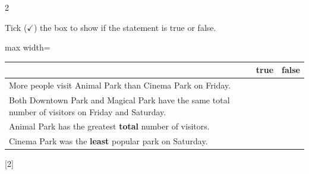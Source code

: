 \documentclass[12pt]{article}
\newcommand{\QuestionMarks}[1]{\hfill [#1]}
\newcommand{\BoxedQuestionLabel}[1]{%
	\begingroup
	\setlength{\fboxsep}{0pt}%
	\raisebox{-0.12cm}{%
		\fbox{%
			\makebox[0.68cm][c]{\rule[-0.18cm]{0pt}{0.68cm}\textbf{#1}}%
		}%
	}%
	\endgroup
}
\begin{document}
\begin{multicols}{2}
\begin{enumerate}[
			label=\BoxedQuestionLabel{\arabic*},
			leftmargin=1.1cm,
			labelwidth=0.72cm,
			labelsep=0.25cm,
			itemsep=0pt,
			topsep=0pt,
			parsep=0pt
			]
			Tick (\(\checkmark\)) the box to show if the statement is true or false.
			
			\vspace{0.35cm}
			
			\begin{center}
				\begin{adjustbox}{max width=\linewidth}
					\begin{tabular}{|>{\raggedright\arraybackslash}p{6.2cm}|>{\centering\arraybackslash}p{0.95cm}|>{\centering\arraybackslash}p{0.95cm}|}
						\cline{2-3}
						\multicolumn{1}{c|}{} & \textbf{true} & \textbf{false} \\
						\hline
						More people visit Animal Park than Cinema Park on Friday. &
						\rule{0pt}{1.0cm} & \\
						\hline
						Both Downtown Park and Magical Park have the same total number of visitors on Friday and Saturday. &
						\rule{0pt}{1.25cm} & \\
						\hline
						Animal Park has the greatest \textbf{total} number of visitors. &
						\rule{0pt}{1.0cm} & \\
						\hline
						Cinema Park was the \textbf{least} popular park on Saturday. &
						\rule{0pt}{1.0cm} & \\
						\hline
					\end{tabular}
				\end{adjustbox}
			\end{center}
			
			\vspace{0.25cm}
			
			\QuestionMarks{2}
			
			\vspace{0.8cm}
			
		\end{enumerate}
	\end{multicols}
\end{document}

